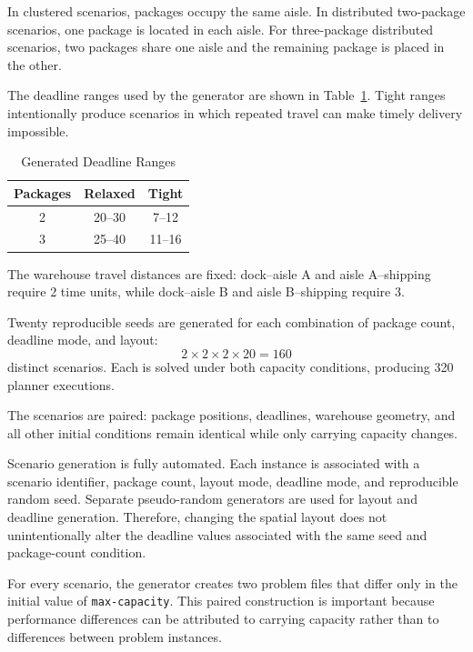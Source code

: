 \documentclass[conference]{IEEEtran}
\begin{document}
In clustered scenarios, packages occupy the same aisle. In distributed
two-package scenarios, one package is located in each aisle. For three-package
distributed scenarios, two packages share one aisle and the remaining package
is placed in the other.

The deadline ranges used by the generator are shown in
Table~\ref{tab:deadlines}. Tight ranges intentionally produce scenarios in
which repeated travel can make timely delivery impossible.

\begin{table}[t]
\caption{Generated Deadline Ranges}
\centering
\begin{tabular}{ccc}
\toprule
Packages & Relaxed & Tight \\
\midrule
2 & 20--30 & 7--12 \\
3 & 25--40 & 11--16 \\
\bottomrule
\end{tabular}
\label{tab:deadlines}
\end{table}

The warehouse travel distances are fixed: dock--aisle A and aisle
A--shipping require 2 time units, while dock--aisle B and aisle B--shipping
require 3.

Twenty reproducible seeds are generated for each combination of package count,
deadline mode, and layout:
\begin{equation}
2\times2\times2\times20=160
\end{equation}
distinct scenarios. Each is solved under both capacity conditions, producing
320 planner executions.

The scenarios are paired: package positions, deadlines, warehouse geometry,
and all other initial conditions remain identical while only carrying capacity
changes.

Scenario generation is fully automated. Each instance is associated with a
scenario identifier, package count, layout mode, deadline mode, and
reproducible random seed. Separate pseudo-random generators are used for
layout and deadline generation. Therefore, changing the spatial layout does
not unintentionally alter the deadline values associated with the same seed
and package-count condition.

For every scenario, the generator creates two problem files that differ only
in the initial value of \texttt{max-capacity}. This paired construction is
important because performance differences can be attributed to carrying
capacity rather than to differences between problem instances.
\end{document}
